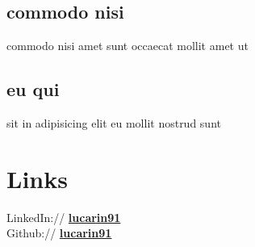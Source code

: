 \documentclass[a4paper]{deedy-resume} %
\begin{document}
\begin{minipage}[t]{0.33\textwidth}
  \subsection{commodo nisi}
    commodo \textbullet{}
    nisi \textbullet{}
    amet \textbullet{}
    sunt \textbullet{}
    occaecat \textbullet{}
    mollit \textbullet{}
    amet \textbullet{}
    ut \textbullet{}
\sectionspace %
  \subsection{eu qui}
    sit \textbullet{}
    in \textbullet{}
    adipisicing \textbullet{}
    elit \textbullet{}
    eu \textbullet{}
    mollit \textbullet{}
    nostrud \textbullet{}
    sunt \textbullet{}
\sectionspace %


\section{Links}

LinkedIn:// \href{https://www.linkedin.com/in/lucarin91}{\bf lucarin91} \\
Github:// \href{https://github.com/lucarin91}{\bf lucarin91} \\
\sectionspace %


\end{minipage} %
%
%
\end{document}
